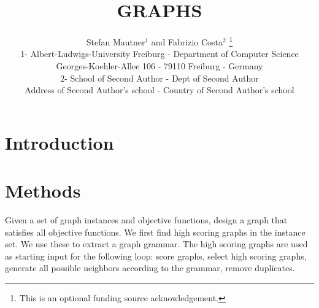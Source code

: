 \documentclass{esannV2}
\begin{document}
\title{GRAPHS}
\author{Stefan Mautner$^1$ and Fabrizio Costa$^2$
%
\thanks{This is an optional funding source acknowledgement.}
%
\vspace{.3cm}\\
%
1- Albert-Ludwigs-University Freiburg  - Department of Computer Science \\
Georges-Koehler-Allee 106  - 79110 Freiburg - Germany
\vspace{.1cm}\\
2- School of Second Author - Dept of Second Author \\
Address of Second Author's school - Country of Second Author's school\\
}
\maketitle






\begin{abstract}
\end{abstract}

\section{Introduction}



\section{Methods}
Given a set of graph instances and objective functions, 
design a graph that satisfies all objective functions. 
We first find high scoring graphs in the instance set. We use these to extract a graph grammar. 
The high scoring graphs are used as starting input for the following loop: 
score graphs, 
select high scoring graphs, 
generate all possible neighbors according to the grammar, 
remove duplicates.
\end{document}
